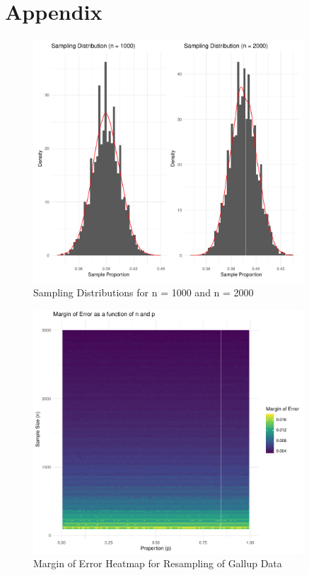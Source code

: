 \documentclass{article}\usepackage[]{graphicx}\usepackage[]{xcolor}
\begin{document}
\newpage
\onecolumn
\section{Appendix}

\begin{figure}[h]
\centering
\includegraphics[width=0.9\textwidth]{Sampling_distributions.pdf}
\caption{Sampling Distributions for n = 1000 and n = 2000}
\end{figure}

\begin{figure}[h]
\centering
\includegraphics[width=0.9\textwidth]{MOEheatmap.pdf}
\caption{Margin of Error Heatmap for Resampling of Gallup Data}
\end{figure}
\end{document}
